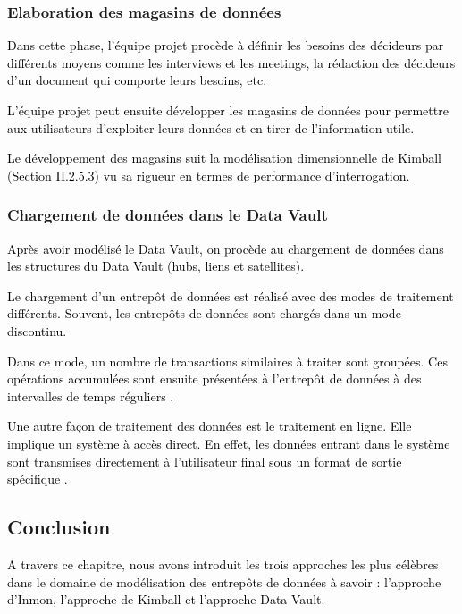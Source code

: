 \documentclass[a4paper,12pt]{report}
\begin{document}
\subsubsection{Elaboration des magasins de données}

\textcolor{black}{Dans cette phase, l’équipe projet procède à définir les besoins des décideurs par différents moyens comme les interviews et les meetings, la rédaction des décideurs d’un document qui comporte leurs besoins, etc.}

\textcolor{black}{L’équipe projet peut ensuite développer les magasins de données pour permettre aux utilisateurs d’exploiter leurs données et en tirer de l’information utile.}

\textcolor{black}{
Le développement des magasins suit la modélisation dimensionnelle de Kimball (Section II.2.5.3) vu sa rigueur en termes de performance d’interrogation.
}

\subsubsection{Chargement de données dans le Data Vault}

\textcolor{black}{Après avoir modélisé le Data Vault, on procède au chargement de données dans les structures du Data Vault (hubs, liens et satellites).}

\textcolor{black}{Le chargement d'un entrepôt de données est réalisé avec des modes de traitement différents. Souvent, les entrepôts de données sont chargés dans un mode discontinu. }

\textcolor{black}{Dans ce mode, un nombre de transactions similaires à traiter sont groupées. Ces opérations accumulées sont ensuite présentées à l'entrepôt de données à des intervalles de temps réguliers \citep{awel2014}.
}

\textcolor{black}{Une autre façon de traitement des données est le traitement en ligne. Elle implique un système à accès direct. En effet, les données entrant dans le système sont transmises directement à l'utilisateur final sous un format de sortie spécifique \citep{awel2014}.}

\subsection*{Conclusion}

\textcolor{black}{A travers ce chapitre, nous avons introduit les trois approches les plus célèbres dans le domaine de modélisation des entrepôts de données à savoir : l’approche d’Inmon, l’approche de Kimball et l’approche Data Vault.}
\end{document}
